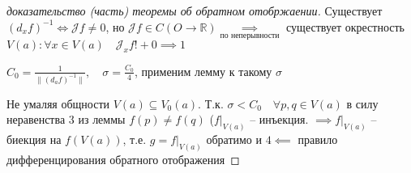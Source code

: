 \documentclass{book}
\newcommand\R{\ensuremath{\mathbb{R}}}
\theoremstyle{definition}
\begin{document}
        \begin{proof}
            [доказательство (часть) теоремы об обратном отобржаении]

            Существует $\left( d_xf \right) ^{-1} \iff  \mathcal{J} f\neq 0$, но $\mathcal{J} f\in C\left( O\to \R \right) \underset{\text{по неперывности}} {\implies}  $ существует окрестность $V(a): \forall x\in V(a)\quad \mathcal{J}_xf !+0 \implies 1$ 

            $C_0 = \frac{1}{\|\left( d_af \right) ^{-1}\|}, \quad \sigma = \frac{C_0}{4}$, применим лемму к такому $\sigma$

            Не умаляя общности  $V(a) \subseteq V_0(a)$. Т.к. $\sigma < C_0\quad \forall p, q\in V(a)$ в силу  неравенства 3 из леммы $f(p)\neq f(q)$ ($f|_{V(a)}$ -- инъекция.  $\implies  f|_{V(a)}$ -- биекция на  $f(V(a))$, т.е.  $g = f|_{V(a)}$ обратимо и  $4 \impliedby $ правило дифференцирования обратного отображения
        \end{proof}
\end{document}
